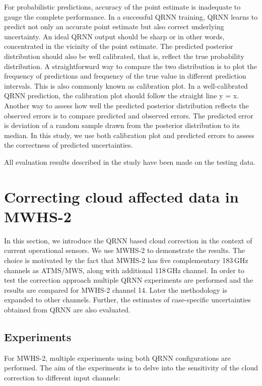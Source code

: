 \documentclass[amt]{copernicus}
\begin{document}
For probabilistic predictions, accuracy of the point estimate is inadequate to gauge the complete performance. In a successful QRNN training, QRNN learns to predict not only an accurate point estimate but also correct underlying uncertainty. An ideal QRNN output should be sharp or in other words, concentrated in the vicinity of the point estimate. The predicted posterior distribution should also be well calibrated, that is, reflect the true probability distribution. A straightforward way to compare the two distribution is to plot the frequency of predictions and frequency of the true value in different prediction intervals. This is also commonly known as calibration plot. In a well-calibrated QRNN prediction, the calibration plot should follow the straight line y = x. Another way to assess how well the predicted posterior distribution reflects the observed errors is to compare predicted and observed errors. The predicted error is deviation of a random sample drawn from the posterior distribution to its median. In this study, we use both calibration plot and predicted errors to assess the correctness of predicted uncertainties.  

All evaluation results described in the study have been made on the testing data.


\section{Correcting cloud affected data in MWHS-2}
%
In this section, we introduce the QRNN based cloud  correction in the context of current operational sensors.  We use MWHS-2 to demonstrate the results. The choice is motivated by the fact that MWHS-2 has five complementary 183\,GHz channels as ATMS/MWS, along with additional 118\,GHz channel. In order to test the correction approach multiple QRNN experiments are performed and the results are compared for MWHS-2 channel 14. Later the methodology is expanded to other channels.  Further, the estimates of case-specific uncertainties obtained from QRNN are also evaluated.

\subsection{Experiments}
%
For MWHS-2, multiple experiments using both QRNN configurations are performed. The aim of the experiments is to delve into the sensitivity of the cloud correction to different input channels:
\end{document}
